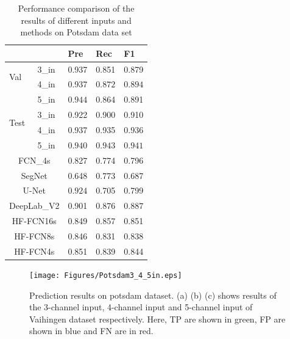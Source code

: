 \begin{table}[htbp]
\vspace{-0.2cm} 
\caption {Performance comparison of the results of different inputs and methods on Potsdam data set}
\label{table:Potsdam-3-4-5in-comp}
\centering
\begin{tabular}{p{0.5cm}<{\centering}|p{1.1cm}<{\centering}|p{1.1cm}<{\centering}|p{1.1cm}<{\centering}|p{1.1cm}<{\centering}}
\hline
&&Pre&Rec&F1\\
\hline
\multirow{2}{*}{Val}&3\_in&0.937&0.851&0.879\\
&4\_in&0.937&$\bm{0.872}$&$\bm{0.894}$\\
&5\_in&$\bm{0.944}$&0.864&0.891\\
\hline
\multirow{2}{*}{Test}&3\_in&0.922&0.900&0.910\\
&4\_in&0.937&0.935&0.936\\
&5\_in&$\bm{0.940}$&$\bm{0.943}$&$\bm{0.941}$\\
\hline\hline
\multicolumn{2}{c|}{FCN\_4s\cite{IEEEexample:Long_2015_CVPR}}&{0.827}&{0.774}&{0.796}\\
\multicolumn{2}{c|}{SegNet\cite{IEEEexample:badrinarayanan2017segnet}}&{0.648}&{0.773}&{0.687}\\
\multicolumn{2}{c|}{U-Net\cite{IEEEexample:ronneberger2015u}}&$\bm{0.924}$&{0.705}&{0.799}\\
\multicolumn{2}{c|}{DeepLab\_V2\cite{IEEEexample:chen2016deeplab}}&{0.901}&$\bm{0.876}$&$\bm{0.887}$\\
\hline \hline
\multicolumn{2}{c|}{HF-FCN16s}&{0.849}&{0.857}&{0.851}\\
\multicolumn{2}{c|}{HF-FCN8s}&{0.846}&{0.831}&{0.838}\\
\multicolumn{2}{c|}{HF-FCN4s}&{0.851}&{0.839}&{0.844}\\
\hline
\end{tabular}
\end{table}

\begin{figure}
\vspace{-0cm} 
\setlength{\abovecaptionskip}{-0cm}
\setlength{\belowcaptionskip}{-2cm}  
\centering
\texttt{[image: Figures/Potsdam3\_4\_5in.eps]}
\caption{Prediction results on potsdam dataset. (a) (b) (c) shows results of the 3-channel input, 4-channel input and 5-channel input of Vaihingen dataset respectively. Here, TP are shown in green, FP are shown in blue and FN are in red.}
\label{fig:Potsdam-3-4-5in-visi}
\end{figure}

